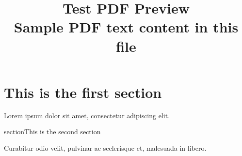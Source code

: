 \documentclass[a4paper]{article}
\begin{document}
\title{\huge Test PDF Preview \\ \large Sample PDF text content in this file}
\maketitle

\large

\section{This is the first section}

Lorem ipsum dolor sit amet, consectetur adipiscing elit.

section{This is the second section}

Curabitur odio velit, pulvinar ac scelerisque et, malesuada in libero.

\end{document}
